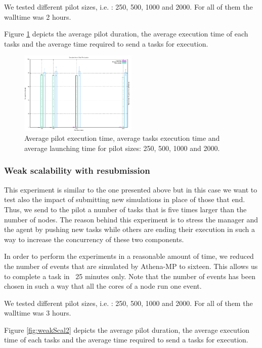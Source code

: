 We tested different pilot sizes, i.e. : 250, 500, 1000 and 2000. For all of them the walltime was 2 hours.

Figure \ref{fig:weakScal1} depicts the average pilot duration, the average execution time of each tasks and the average time required to send a tasks for execution.  


\begin{figure}[!htb]
        \includegraphics[width=0.5\textwidth]{./figures/NGE/Weak.pdf}
    \caption{Average pilot execution time, average tasks execution time and average launching time for pilot sizes: 250, 500, 1000 and 2000.}
\label{fig:weakScal1}
\end{figure}
\subsubsection{Weak scalability with resubmission }
This experiment is similar to the one presented above but in this case we want to test also the impact of submitting new simulations in place of those that end. Thus, we send to the pilot a number of tasks that is five times larger than the number of nodes. The reason behind this experiment is to stress the manager and the agent by pushing new tasks while others are ending their execution in such a way to increase the concurrency of these two components.

In order to perform the experiments in a reasonable amount of time, we reduced  the number of events that are simulated by Athena-MP to sixteen. This allows us to complete a task in ~25 minutes only. Note that the number of events has been chosen in such a way that all the cores of a node run one event.

We tested different pilot sizes, i.e. : 250, 500, 1000 and 2000. For all of them the walltime was 3 hours. 

Figure \ref{fig:weakScal2}   depicts the average pilot duration, the average execution time of each tasks and the average time required to send a tasks for execution.  

